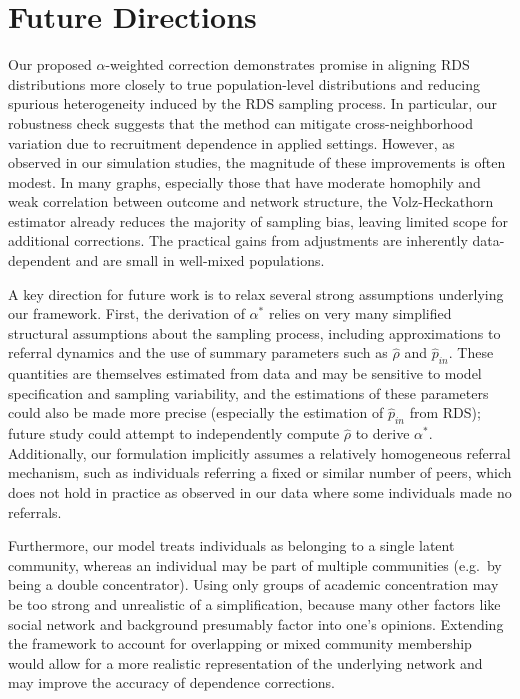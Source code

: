 \documentclass[11pt,a4paper,twocolumn,twoside]{rho-class/rho}
\begin{document}
\section{Future Directions}
Our proposed $\alpha$-weighted correction demonstrates promise in aligning RDS distributions more closely to true population-level distributions and reducing spurious heterogeneity induced by the RDS sampling process. In particular, our robustness check suggests that the method can mitigate cross-neighborhood variation due to recruitment dependence in applied settings. However, as observed in our simulation studies, the magnitude of these improvements is often modest. In many graphs, especially those that have moderate homophily and weak correlation between outcome and network structure, the Volz-Heckathorn estimator already reduces the majority of sampling bias, leaving limited scope for additional corrections. The practical gains from adjustments are inherently data-dependent and are small in well-mixed populations.

A key direction for future work is to relax several strong assumptions underlying our framework. First, the derivation of $\alpha^*$ relies on very many simplified structural assumptions about the sampling process, including approximations to referral dynamics and the use of summary parameters such as $\hat{\rho}$ and $\hat{p}_{in}$. These quantities are themselves estimated from data and may be sensitive to model specification and sampling variability, and the estimations of these parameters could also be made more precise (especially the estimation of $\hat p_{in}$ from RDS); future study could attempt to independently compute $\hat{\rho}$ to derive $\alpha^*$. Additionally, our formulation implicitly assumes a relatively homogeneous referral mechanism, such as individuals referring a fixed or similar number of peers, which does not hold in practice as observed in our data where some individuals made no referrals.

Furthermore, our model treats individuals as belonging to a single latent community, whereas an individual may be part of multiple communities (e.g.~by being a double concentrator). Using only groups of academic concentration may be too strong and unrealistic of a simplification, because many other factors like social network and background presumably factor into one's opinions. Extending the framework to account for overlapping or mixed community membership would allow for a more realistic representation of the underlying network and may improve the accuracy of dependence corrections.
\end{document}
